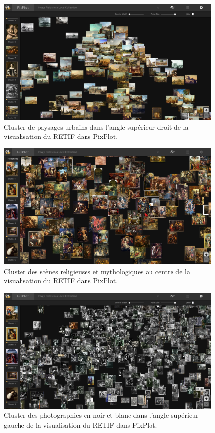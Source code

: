 \begin{figure}[H]
    \centering
    \includegraphics[width=1\textwidth]{annexes/figures/PP-vedute.png}
    \caption{Cluster de paysages urbains dans l'angle supérieur droit de la visualisation du RETIF dans PixPlot.}
    \label{fig:PP-vedute}
\end{figure}

\begin{figure}[H]
    \centering
    \includegraphics[width=1\textwidth]{annexes/figures/PP-scenes.png}
    \caption{Cluster des scènes religieuses et mythologiques au centre de la visualisation du RETIF dans PixPlot.}
    \label{fig:PP-scenes}
\end{figure}

\begin{figure}[H]
    \centering
    \includegraphics[width=1\textwidth]{annexes/figures/PP-n&b.png}
    \caption{Cluster des photographies en noir et blanc dans l'angle supérieur gauche de la visualisation du RETIF dans PixPlot.}
    \label{fig:PP-n&b}
\end{figure}

